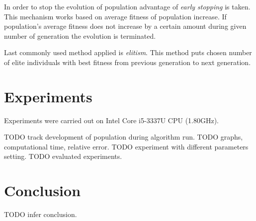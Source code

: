 \documentclass{article}
\begin{document}
In order to stop the evolution of population advantage of
\textit{early stopping} is taken.
This mechanism works based on average fitness of population increase.
If population's average fitness does not increase by a certain amount
during given number of generation the evolution is terminated.

Last commonly used method applied is \textit{elitism}.
This method puts chosen number of elite individuals with best fitness
from previous generation to next generation.

\section{Experiments}

Experiments were carried out on Intel Core i5-3337U CPU (1.80GHz).

TODO track development of population during algorithm run.
TODO graphs, computational time, relative error.
TODO experiment with different parameters setting.
TODO evaluated experiments.

\section{Conclusion}

TODO infer conclusion.




\end{document}

